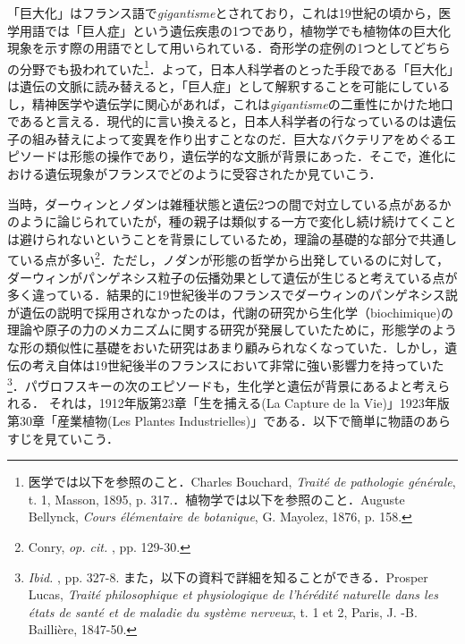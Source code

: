 「巨大化」はフランス語で\emph{gigantisme}とされており，これは19世紀の頃から，医学用語では「巨人症」という遺伝疾患の1つであり，植物学でも植物体の巨大化現象を示す際の用語でとして用いられている．奇形学の症例の1つとしてどちらの分野でも扱われていた\footnote{医学では以下を参照のこと．Charles Bouchard, \emph{Traité de pathologie générale}, t. 1, Masson, 1895, p. 317.．植物学では以下を参照のこと．Auguste Bellynck, \emph{Cours élémentaire de botanique}, G. Mayolez, 1876, p. 158.}．よって，日本人科学者のとった手段である「巨大化」は遺伝の文脈に読み替えると，「巨人症」として解釈することを可能にしているし，精神医学や遺伝学に関心があれば，これは\emph{gigantisme}の二重性にかけた地口であると言える．現代的に言い換えると，日本人科学者の行なっているのは遺伝子の組み替えによって変異を作り出すことなのだ．巨大なバクテリアをめぐるエピソードは形態の操作であり，遺伝学的な文脈が背景にあった．そこで，進化における遺伝現象がフランスでどのように受容されたか見ていこう．

当時，ダーウィンとノダンは雑種状態と遺伝2つの間で対立している点があるかのように論じられていたが，種の親子は類似する一方で変化し続け続けてくことは避けられないということを背景にしているため，理論の基礎的な部分で共通している点が多い\footnote{Conry, \emph{op. cit. }, pp. 129-30.}．ただし，ノダンが形態の哲学から出発しているのに対して，ダーウィンがパンゲネシス粒子の伝播効果として遺伝が生じると考えている点が多く違っている．結果的に19世紀後半のフランスでダーウィンのパンゲネシス説が遺伝の説明で採用されなかったのは，代謝の研究から生化学（biochimique)の理論や原子の力のメカニズムに関する研究が発展していたために，形態学のような形の類似性に基礎をおいた研究はあまり顧みられなくなっていた．しかし，遺伝の考え自体は19世紀後半のフランスにおいて非常に強い影響力を持っていた\footnote{\emph{Ibid. }, pp. 327-8. また，以下の資料で詳細を知ることができる．Prosper Lucas, \emph{Traité philosophique et physiologique de l'hérédité naturelle dans les états de santé et de maladie du système nerveux}, t. 1 et 2, Paris, J. -B. Baillière, 1847-50.}．パヴロフスキーの次のエピソードも，生化学と遺伝が背景にあるよと考えられる．
それは，1912年版第23章「生を捕える(La Capture de la Vie)」1923年版第30章「産業植物(Les Plantes Industrielles)」である．以下で簡単に物語のあらすじを見ていこう．

